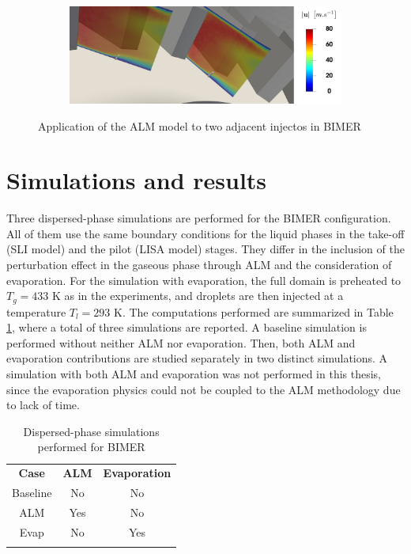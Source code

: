 \begin{figure}[ht]
\centering
\begin{subfigure}[b]{1.0\textwidth}
	\centering
   \includegraphics[scale=0.18]{./part3_applications/figures_ch9_lagrangian/turbulent_structures/ALM_revolution}
\end{subfigure}
   \caption{Application of the ALM model to two adjacent injectos in BIMER}
\label{fig:BIMER_ALM_revolution}
\end{figure}

\section{Simulations and results}
\label{sec:BIMER_LGS_simus_and_results}

Three dispersed-phase simulations are performed for the BIMER configuration. All of them use the same boundary conditions for the liquid phases in the take-off (SLI model) and the pilot (LISA model) stages. They differ in the inclusion of the perturbation effect in the gaseous phase through ALM and the consideration of evaporation. For the simulation with evaporation, the full domain is preheated to $T_g = 433$ K as in the experiments, and droplets are then injected at a temperature $T_l = 293 $ K.  The computations performed are summarized in Table \ref{tab:BIMER_dispersed_phase_simulations_performed}, where a total of three simulations are reported. A baseline simulation is performed without neither ALM nor evaporation. Then, both ALM and evaporation contributions are studied separately in two distinct simulations. A simulation with both ALM and evaporation was not performed in this thesis, since the evaporation physics could not be coupled to the ALM methodology due to lack of time. %

\begin{table}[!h]
\centering
\caption{Dispersed-phase simulations performed for BIMER}
\begin{tabular}{ccc}
\thickhline
\textbf{Case} & \textbf{ALM} & \textbf{Evaporation} \\
\thickhline
Baseline & No & No \\
ALM & Yes & No \\
Evap & No & Yes \\%
\thickhline
\end{tabular}
\label{tab:BIMER_dispersed_phase_simulations_performed}
\end{table}


